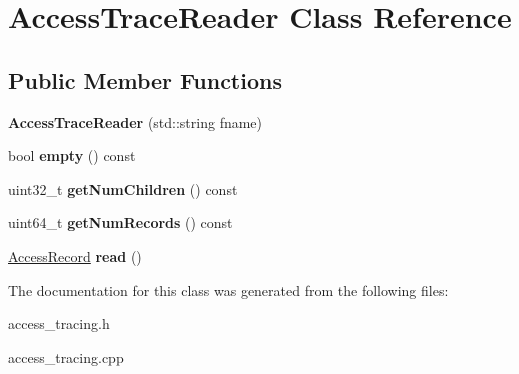 \hypertarget{classAccessTraceReader}{\section{Access\-Trace\-Reader Class Reference}
\label{classAccessTraceReader}
}
\subsection*{Public Member Functions}
\begin{DoxyCompactItemize}
\item 
\hypertarget{classAccessTraceReader_a82e1f16076492d03edc1347eae753029}{{\bfseries Access\-Trace\-Reader} (std\-::string fname)}\label{classAccessTraceReader_a82e1f16076492d03edc1347eae753029}

\item 
\hypertarget{classAccessTraceReader_aae0da4bbfadad6f563a90fa5179afd15}{bool {\bfseries empty} () const }\label{classAccessTraceReader_aae0da4bbfadad6f563a90fa5179afd15}

\item 
\hypertarget{classAccessTraceReader_a8253d0764d05a21f79a2c508fc88593e}{uint32\-\_\-t {\bfseries get\-Num\-Children} () const }\label{classAccessTraceReader_a8253d0764d05a21f79a2c508fc88593e}

\item 
\hypertarget{classAccessTraceReader_a615bdd807251b7177d5112caefb04ba0}{uint64\-\_\-t {\bfseries get\-Num\-Records} () const }\label{classAccessTraceReader_a615bdd807251b7177d5112caefb04ba0}

\item 
\hypertarget{classAccessTraceReader_a344dae9e9818665d382681daae002f1e}{\hyperlink{structAccessRecord}{Access\-Record} {\bfseries read} ()}\label{classAccessTraceReader_a344dae9e9818665d382681daae002f1e}

\end{DoxyCompactItemize}


The documentation for this class was generated from the following files\-:\begin{DoxyCompactItemize}
\item 
access\-\_\-tracing.\-h\item 
access\-\_\-tracing.\-cpp\end{DoxyCompactItemize}
